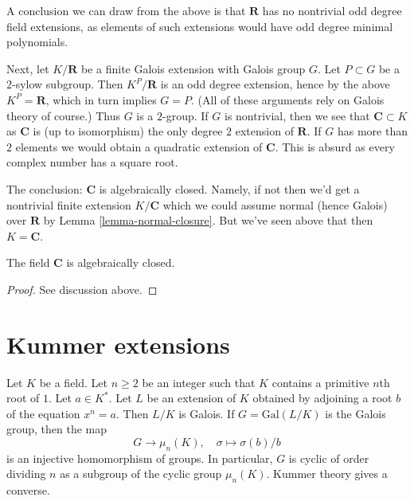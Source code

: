 \medskip\noindent
A conclusion we can draw from the above is that $\mathbf{R}$ has
no nontrivial odd degree field extensions, as elements of such extensions
would have odd degree minimal polynomials.

\medskip\noindent
Next, let $K/\mathbf{R}$ be a finite Galois extension with Galois group $G$.
Let $P \subset G$ be a $2$-sylow subgroup. Then $K^P/\mathbf{R}$ is an
odd degree extension, hence by the above $K^P = \mathbf{R}$,
which in turn implies
$G = P$. (All of these arguments rely on Galois theory of course.)
Thus $G$ is a $2$-group. If $G$ is nontrivial, then we see that
$\mathbf{C} \subset K$ as $\mathbf{C}$ is (up to isomorphism) the only
degree $2$ extension of $\mathbf{R}$. If $G$ has more than $2$ elements
we would obtain a quadratic extension of $\mathbf{C}$.
This is absurd as every complex number has a square root.

\medskip\noindent
The conclusion: $\mathbf{C}$ is algebraically closed. Namely, if not
then we'd get a nontrivial finite extension $K/\mathbf{C}$
which we could assume normal (hence Galois) over $\mathbf{R}$ by
Lemma \ref{lemma-normal-closure}. But we've seen above that then
$K = \mathbf{C}$.

\begin{lemma}
\label{lemma-C-algebraically-closed}
The field $\mathbf{C}$ is algebraically closed.
\end{lemma}

\begin{proof}
See discussion above.
\end{proof}





\section{Kummer extensions}
\label{section-Kummer}

\noindent
Let $K$ be a field. Let $n \geq 2$ be an integer such that $K$ contains
a primitive $n$th root of $1$. Let $a \in K^*$. Let $L$ be an extension
of $K$ obtained by adjoining a root $b$ of the equation $x^n = a$.
Then $L/K$ is Galois. If $G = \text{Gal}(L/K)$ is the Galois group, then
the map
$$
G \longrightarrow \mu_n(K),\quad \sigma \longmapsto \sigma(b)/b
$$
is an injective homomorphism of groups. In particular, $G$ is cyclic
of order dividing $n$ as a subgroup of the cyclic group $\mu_n(K)$.
Kummer theory gives a converse.


